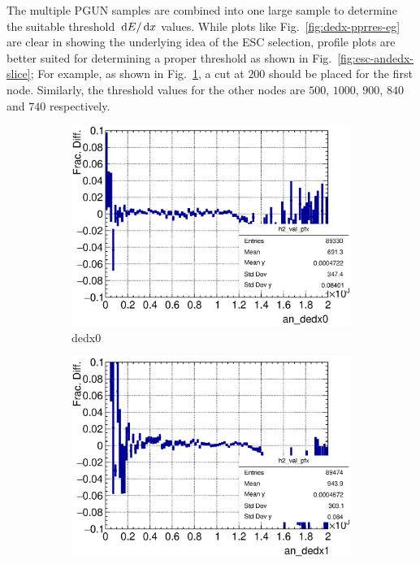    The multiple PGUN samples are combined into one large sample to determine the suitable threshold $\,\textrm{d}E/\,\textrm{d}x$ values.
   While plots like Fig.~\ref{fig:dedx-pprres-eg} are clear in showing the underlying idea of the ESC selection, profile plots are better suited for determining a proper threshold as shown in Fig.~\ref{fig:esc-andedx-slice};
   For example, as shown in Fig.~\ref{subfig:ans-dedx0-ppr-slice}, a cut at $200$ should be placed for the first node.
   Similarly, the threshold values for the other nodes are $500$, $1000$, $900$, $840$ and $740$ respectively.
   \begin{figure}[t]
       \centering
       \begin{subfigure}{\trfigwid\textwidth}
            \includegraphics[width=\textwidth]{figures/sel/ans_dedx0_vs_p_pr_res_hist2d_al2_selpr_con_slice.eps}
            \caption{dedx0}
            \label{subfig:ans-dedx0-ppr-slice}
       \end{subfigure}
       \begin{subfigure}{\trfigwid\textwidth}
            \includegraphics[width=\textwidth]{figures/sel/ans_dedx1_vs_p_pr_res_hist2d_al2_selpr_con_slice.eps}

\end{subfigure}
\end{figure}
